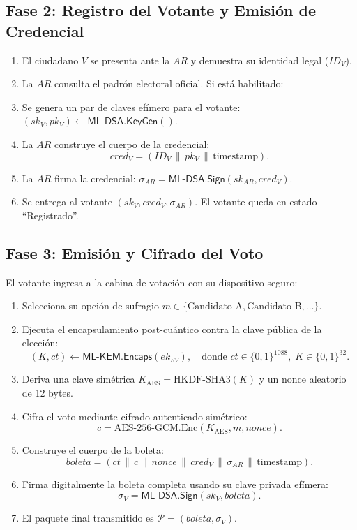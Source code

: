 \documentclass[11pt,a4paper,twoside,openright]{book}
\theoremstyle{plain}
\theoremstyle{definition}
\theoremstyle{remark}
\newcommand{\MLKEM}{\textsf{ML-KEM}}
\newcommand{\MLDSA}{\textsf{ML-DSA}}
\newcommand{\KeyGen}{\mathsf{KeyGen}}
\newcommand{\Encaps}{\mathsf{Encaps}}
\newcommand{\Sign}{\mathsf{Sign}}
\begin{document}
\subsection{Fase 2: Registro del Votante y Emisi\'on de Credencial}
\begin{enumerate}
  \item El ciudadano $V$ se presenta ante la $AR$ y demuestra su identidad legal ($ID_V$).
  \item La $AR$ consulta el padr\'on electoral oficial. Si est\'a habilitado:
  \item Se genera un par de claves ef\'imero para el votante: $(sk_V, pk_V) \leftarrow \MLDSA.\KeyGen()$.
  \item La $AR$ construye el cuerpo de la credencial:
  \[
    \mathit{cred}_V = (ID_V \,\|\, pk_V \,\|\, \mathrm{timestamp}).
  \]
  \item La $AR$ firma la credencial: $\sigma_{AR} = \MLDSA.\Sign(sk_{AR}, \mathit{cred}_V)$.
  \item Se entrega al votante $(sk_V, \mathit{cred}_V, \sigma_{AR})$. El votante queda en estado ``Registrado''.
\end{enumerate}

\subsection{Fase 3: Emisi\'on y Cifrado del Voto}
El votante ingresa a la cabina de votaci\'on con su dispositivo seguro:
\begin{enumerate}
  \item Selecciona su opci\'on de sufragio $m \in \{\text{Candidato A}, \text{Candidato B}, \ldots\}$.
  \item Ejecuta el encapsulamiento post-cu\'antico contra la clave p\'ublica de la elecci\'on:
  \[
    (K, ct) \leftarrow \MLKEM.\Encaps(ek_{SV}), \quad \text{donde } ct \in \{0, 1\}^{1088}, \; K \in \{0, 1\}^{32}.
  \]
  \item Deriva una clave sim\'etrica $K_{\text{AES}} = \mathrm{HKDF}\text{-}\mathrm{SHA3}(K)$ y un nonce aleatorio de 12 bytes.
  \item Cifra el voto mediante cifrado autenticado sim\'etrico:
  \[
    c = \mathrm{AES}\text{-}256\text{-}\mathrm{GCM.Enc}(K_{\text{AES}}, m, \mathit{nonce}).
  \]
  \item Construye el cuerpo de la boleta:
  \[
    \mathit{boleta} = (ct \,\|\, c \,\|\, \mathit{nonce} \,\|\, \mathit{cred}_V \,\|\, \sigma_{AR} \,\|\, \mathrm{timestamp}).
  \]
  \item Firma digitalmente la boleta completa usando su clave privada ef\'imera:
  \[
    \sigma_V = \MLDSA.\Sign(sk_V, \mathit{boleta}).
  \]
  \item El paquete final transmitido es $\mathcal{P} = (\mathit{boleta}, \sigma_V)$.
\end{enumerate}
\end{document}
